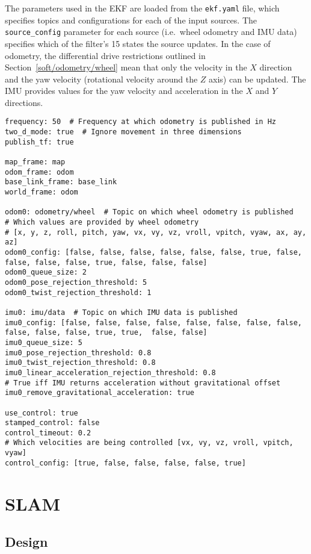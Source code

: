 The parameters used in the EKF are loaded from the \verb|ekf.yaml| file, which
specifies topics and configurations for each of the input sources. The
\verb|source_config| parameter for each source (i.e.\ wheel odometry and IMU data)
specifies which of the filter's 15 states the source updates. In the case of
odometry, the differential drive restrictions outlined in
Section~\ref{soft/odometry/wheel} mean that only the velocity in the $X$ direction
and the yaw velocity (rotational velocity around the $Z$ axis) can be updated.
The IMU provides values for the yaw velocity and acceleration in the $X$ and
$Y$ directions.

\begin{lstlisting}[caption={EKF YAML file}, label={lst:ekf_yaml}, style=yaml]
frequency: 50  # Frequency at which odometry is published in Hz
two_d_mode: true  # Ignore movement in three dimensions
publish_tf: true

map_frame: map
odom_frame: odom
base_link_frame: base_link
world_frame: odom

odom0: odometry/wheel  # Topic on which wheel odometry is published
# Which values are provided by wheel odometry
# [x, y, z, roll, pitch, yaw, vx, vy, vz, vroll, vpitch, vyaw, ax, ay, az]
odom0_config: [false, false, false, false, false, false, true, false, false, false, false, true, false, false, false]
odom0_queue_size: 2
odom0_pose_rejection_threshold: 5
odom0_twist_rejection_threshold: 1

imu0: imu/data  # Topic on which IMU data is published
imu0_config: [false, false, false, false, false, false, false, false, false, false, false, true, true,  false, false]
imu0_queue_size: 5
imu0_pose_rejection_threshold: 0.8
imu0_twist_rejection_threshold: 0.8
imu0_linear_acceleration_rejection_threshold: 0.8
# True iff IMU returns acceleration without gravitational offset
imu0_remove_gravitational_acceleration: true

use_control: true
stamped_control: false
control_timeout: 0.2
# Which velocities are being controlled [vx, vy, vz, vroll, vpitch, vyaw]
control_config: [true, false, false, false, false, true]
\end{lstlisting}





\section{SLAM}\label{soft/SLAM}

\subsection{Design}\label{soft/SLAM/design}

